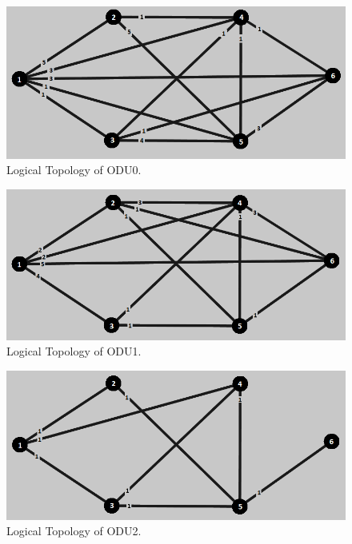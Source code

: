 \begin{figure}[H]
\centering
\includegraphics[width=13cm]{sdf/heuristic/figures/topologies/opaque_protec/low/logical_topology_odu0_low}
\caption{Logical Topology of ODU0.}
\label{logical_ODU0_protec_ref_low_heuristic}
\end{figure}

\begin{figure}[H]
\centering
\includegraphics[width=13cm]{sdf/heuristic/figures/topologies/opaque_protec/low/logical_topology_odu1_low}
\caption{Logical Topology of ODU1.}
\label{logical_ODU1_protec_ref_low_heuristic}
\end{figure}

\begin{figure}[H]
\centering
\includegraphics[width=13cm]{sdf/heuristic/figures/topologies/opaque_protec/low/logical_topology_odu2_low}
\caption{Logical Topology of ODU2.}
\label{logical_ODU2_protec_ref_low_heuristic}
\end{figure}

